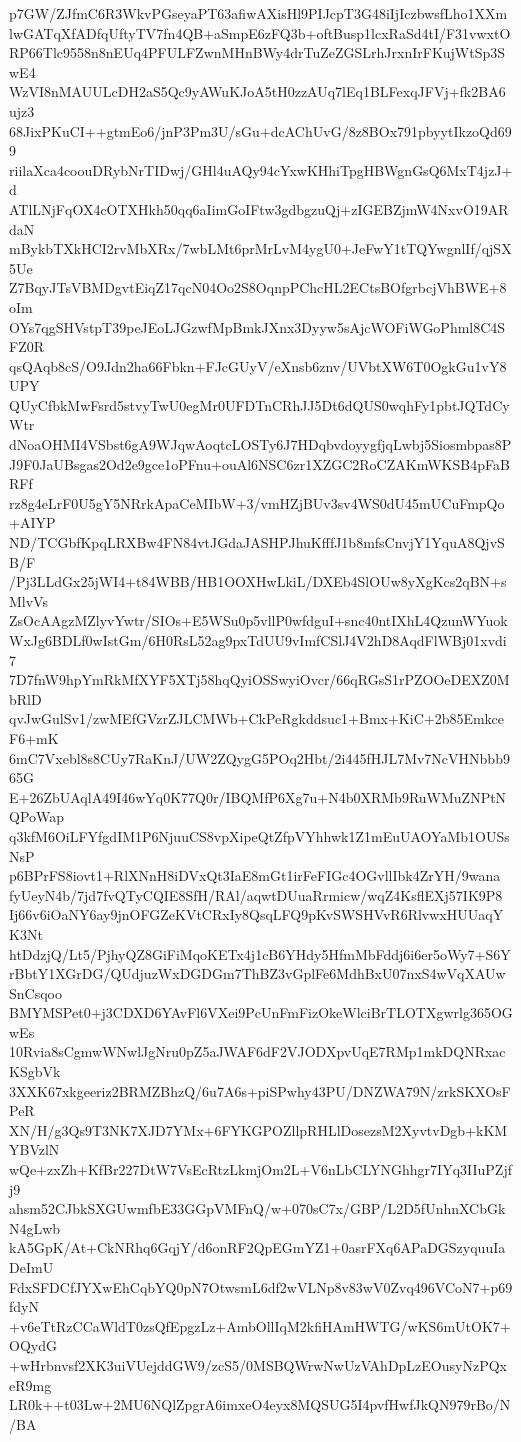 p7GW/ZJfmC6R3WkvPGseyaPT63afiwAXisHl9PIJcpT3G48iIjIczbwsfLho1XXm
lwGATqXfADfqUftyTV7fn4QB+aSmpE6zFQ3b+oftBusp1lcxRaSd4tI/F31vwxtO
RP66Tlc9558n8nEUq4PFULFZwnMHnBWy4drTuZeZGSLrhJrxnIrFKujWtSp3SwE4
WzVI8nMAUULcDH2aS5Qc9yAWuKJoA5tH0zzAUq7lEq1BLFexqJFVj+fk2BA6ujz3
68JixPKuCI++gtmEo6/jnP3Pm3U/sGu+dcAChUvG/8z8BOx791pbyytIkzoQd699
riilaXca4coouDRybNrTIDwj/GHl4uAQy94cYxwKHhiTpgHBWgnGsQ6MxT4jzJ+d
ATlLNjFqOX4cOTXHkh50qq6aIimGoIFtw3gdbgzuQj+zIGEBZjmW4NxvO19ARdaN
mBykbTXkHCI2rvMbXRx/7wbLMt6prMrLvM4ygU0+JeFwY1tTQYwgnlIf/qjSX5Ue
Z7BqyJTsVBMDgvtEiqZ17qcN04Oo2S8OqnpPChcHL2ECtsBOfgrbcjVhBWE+8oIm
OYs7qgSHVstpT39peJEoLJGzwfMpBmkJXnx3Dyyw5sAjcWOFiWGoPhml8C4SFZ0R
qsQAqb8cS/O9Jdn2ha66Fbkn+FJcGUyV/eXnsb6znv/UVbtXW6T0OgkGu1vY8UPY
QUyCfbkMwFsrd5stvyTwU0egMr0UFDTnCRhJJ5Dt6dQUS0wqhFy1pbtJQTdCyWtr
dNoaOHMI4VSbst6gA9WJqwAoqtcLOSTy6J7HDqbvdoyygfjqLwbj5Siosmbpas8P
J9F0JaUBsgas2Od2e9gce1oPFnu+ouAl6NSC6zr1XZGC2RoCZAKmWKSB4pFaBRFf
rz8g4eLrF0U5gY5NRrkApaCeMIbW+3/vmHZjBUv3sv4WS0dU45mUCuFmpQo+AIYP
ND/TCGbfKpqLRXBw4FN84vtJGdaJASHPJhuKfffJ1b8mfsCnvjY1YquA8QjvSB/F
/Pj3LLdGx25jWI4+t84WBB/HB1OOXHwLkiL/DXEb4SlOUw8yXgKcs2qBN+sMlvVs
ZsOcAAgzMZlyvYwtr/SIOs+E5WSu0p5vllP0wfdguI+snc40ntIXhL4QzunWYuok
WxJg6BDLf0wIstGm/6H0RsL52ag9pxTdUU9vImfCSlJ4V2hD8AqdFlWBj01xvdi7
7D7fnW9hpYmRkMfXYF5XTj58hqQyiOSSwyiOvcr/66qRGsS1rPZOOeDEXZ0MbRlD
qvJwGulSv1/zwMEfGVzrZJLCMWb+CkPeRgkddsuc1+Bmx+KiC+2b85EmkceF6+mK
6mC7Vxebl8s8CUy7RaKnJ/UW2ZQygG5POq2Hbt/2i445fHJL7Mv7NcVHNbbb965G
E+26ZbUAqlA49I46wYq0K77Q0r/IBQMfP6Xg7u+N4b0XRMb9RuWMuZNPtNQPoWap
q3kfM6OiLFYfgdIM1P6NjuuCS8vpXipeQtZfpVYhhwk1Z1mEuUAOYaMb1OUSsNsP
p6BPrFS8iovt1+RlXNnH8iDVxQt3IaE8mGt1irFeFIGc4OGvllIbk4ZrYH/9wana
fyUeyN4b/7jd7fvQTyCQIE8SfH/RAl/aqwtDUuaRrmicw/wqZ4KsflEXj57IK9P8
Ij66v6iOaNY6ay9jnOFGZeKVtCRxIy8QsqLFQ9pKvSWSHVvR6RlvwxHUUaqYK3Nt
htDdzjQ/Lt5/PjhyQZ8GiFiMqoKETx4j1cB6YHdy5HfmMbFddj6i6er5oWy7+S6Y
rBbtY1XGrDG/QUdjuzWxDGDGm7ThBZ3vGplFe6MdhBxU07nxS4wVqXAUwSnCsqoo
BMYMSPet0+j3CDXD6YAvFl6VXei9PcUnFmFizOkeWlciBrTLOTXgwrlg365OGwEs
10Rvia8sCgmwWNwlJgNru0pZ5aJWAF6dF2VJODXpvUqE7RMp1mkDQNRxacKSgbVk
3XXK67xkgeeriz2BRMZBhzQ/6u7A6s+piSPwhy43PU/DNZWA79N/zrkSKXOsFPeR
XN/H/g3Qs9T3NK7XJD7YMx+6FYKGPOZllpRHLlDosezsM2XyvtvDgb+kKMYBVzlN
wQe+zxZh+KfBr227DtW7VsEcRtzLkmjOm2L+V6nLbCLYNGhhgr7IYq3IIuPZjfj9
ahsm52CJbkSXGUwmfbE33GGpVMFnQ/w+070sC7x/GBP/L2D5fUnhnXCbGkN4gLwb
kA5GpK/At+CkNRhq6GqjY/d6onRF2QpEGmYZ1+0asrFXq6APaDGSzyquuIaDeImU
FdxSFDCfJYXwEhCqbYQ0pN7OtwsmL6df2wVLNp8v83wV0Zvq496VCoN7+p69fdyN
+v6eTtRzCCaWldT0zsQfEpgzLz+AmbOllIqM2kfiHAmHWTG/wKS6mUtOK7+OQydG
+wHrbnvsf2XK3uiVUejddGW9/zcS5/0MSBQWrwNwUzVAhDpLzEOusyNzPQxeR9mg
LR0k++t03Lw+2MU6NQlZpgrA6imxeO4eyx8MQSUG5I4pvfHwfJkQN979rBo/N/BA
